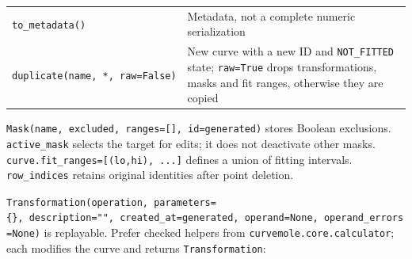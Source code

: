 \documentclass[
  10pt,
  a4paper,
  oneside]{scrreprt}
\begin{document}
\begin{longtable}[]{@{}ll@{}}
\begin{minipage}[t]{0.47\columnwidth}\raggedright
\texttt{to\_metadata()}\strut
\end{minipage} & \begin{minipage}[t]{0.47\columnwidth}\raggedright
Metadata, not a complete numeric serialization\strut
\end{minipage}\tabularnewline
\begin{minipage}[t]{0.47\columnwidth}\raggedright
\texttt{duplicate(name,\ *,\ raw=False)}\strut
\end{minipage} & \begin{minipage}[t]{0.47\columnwidth}\raggedright
New curve with a new ID and \texttt{NOT\_FITTED} state;
\texttt{raw=True} drops transformations, masks and fit ranges, otherwise
they are copied\strut
\end{minipage}\tabularnewline
\bottomrule
\end{longtable}

\texttt{Mask(name,\ excluded,\ ranges={[}{]},\ id=generated)} stores
Boolean exclusions. \texttt{active\_mask} selects the target for edits;
it does not deactivate other masks.
\texttt{curve.fit\_ranges={[}(lo,hi),\ ...{]}} defines a union of
fitting intervals. \texttt{row\_indices} retains original identities
after point deletion.

\texttt{Transformation(operation,\ parameters=\{\},\ description="",\ created\_at=generated,\ operand=None,\ operand\_errors=None)}
is replayable. Prefer checked helpers from
\texttt{curvemole.core.calculator}; each modifies the curve and returns
\texttt{Transformation}:
\end{document}

